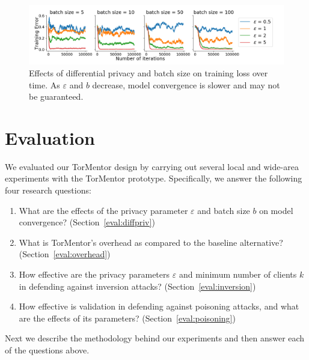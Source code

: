 \begin{figure}[t]
	\includegraphics[width=\textwidth]{fig/giantplot}
	\caption{Effects of differential privacy and batch size on training
		loss over time. As $\varepsilon$ and $b$ decrease, model convergence
		is slower and may not be guaranteed.}
	\label{fig:bs50}
\end{figure}

\chapter{Evaluation}
\label{sec:eval}

We evaluated our TorMentor design by carrying out several local
and wide-area experiments with the TorMentor prototype. Specifically,
we answer the following four research questions:

\begin{enumerate}

\item What are the effects of the privacy parameter $\varepsilon$ and
  batch size $b$ on model convergence?  (Section~\ref{eval:diffpriv})

\item What is TorMentor's overhead as compared to the baseline
  alternative? (Section~\ref{eval:overhead})
  
\item How effective are the privacy parameters $\varepsilon$ and
  minimum number of clients $k$ in defending against inversion
  attacks?  (Section~\ref{eval:inversion})
  
\item How effective is validation in defending against poisoning
  attacks, and what are the effects of its parameters?
  (Section~\ref{eval:poisoning})

\end{enumerate}

Next we describe the methodology behind our experiments and then
answer each of the questions above.

